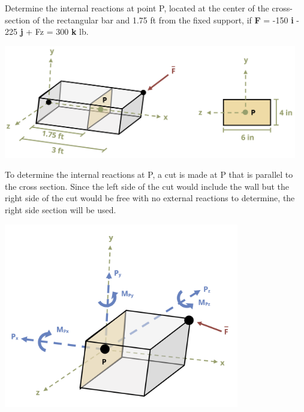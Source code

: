 \documentclass[
  letterpaper,
  DIV=11,
  numbers=noendperiod]{scrreprt}
\begin{document}
\begin{tcolorbox}[enhanced jigsaw, colbacktitle=quarto-callout-note-color!10!white, title={Example 1.6}, coltitle=black, leftrule=.75mm, rightrule=.15mm, opacityback=0, breakable, colframe=quarto-callout-note-color-frame, left=2mm, arc=.35mm, colback=white, bottomrule=.15mm, bottomtitle=1mm, toptitle=1mm, titlerule=0mm, opacitybacktitle=0.6, toprule=.15mm]

Determine the internal reactions at point P, located at the center of
the cross-section of the rectangular bar and 1.75 ft from the fixed
support, if \textbf{F} = -150 \textbf{i} - 225 \textbf{j} + Fz = 300
\textbf{k} lb.

\begin{center}
\includegraphics[width=5.04167in,height=\textheight]{images/CH1 PNGs/example 1.6 part 1.png}
\end{center}

To determine the internal reactions at P, a cut is made at P that is
parallel to the cross section. Since the left side of the cut would
include the wall but the right side of the cut would be free with no
external reactions to determine, the right side section will be used.

\begin{center}
\includegraphics[width=4.04167in,height=\textheight]{images/CH1 PNGs/example 1.6 part 2.png}
\end{center}


\end{tcolorbox}
\end{document}
